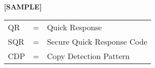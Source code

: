 \begin{center}
	\textbf{[SAMPLE]}
\end{center}

\begin{tabular}{llp{3in}}
	
		QR &  \hspace{1.5cm} = &	Quick Response\\
		SQR &  \hspace{1.5cm} = &	Secure Quick Response Code\\
		CDP &  \hspace{1.5cm} = &	Copy Detection Pattern\\
		
		
\end{tabular}
